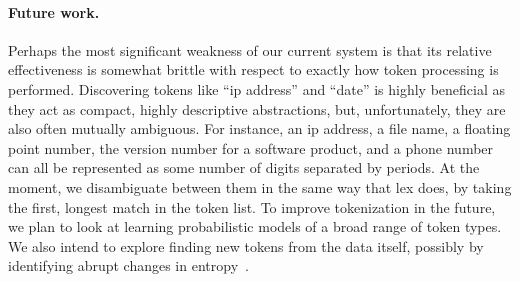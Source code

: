 \paragraph*{Future work.}  Perhaps the most significant weakness of our current
system is that its relative effectiveness is somewhat brittle with respect to
exactly how token processing is performed.
Discovering tokens like ``ip address'' and ``date'' is highly beneficial
as they act as compact, highly 
descriptive abstractions, but, unfortunately, they are also often 
mutually ambiguous.  For instance, an ip address, a file name, a 
floating point number, the version number for a software product,
and a phone number can all be represented as some number of digits 
separated by periods.  At the moment, we disambiguate between them 
in the same way that lex does, by taking the first, longest match 
in the token list.
To improve tokenization in the future, we plan to look at learning
probabilistic models of a broad range of token types.  We also
intend to explore finding new tokens from the data itself,
possibly by identifying abrupt changes in entropy~\cite{hutchens98finding}.




